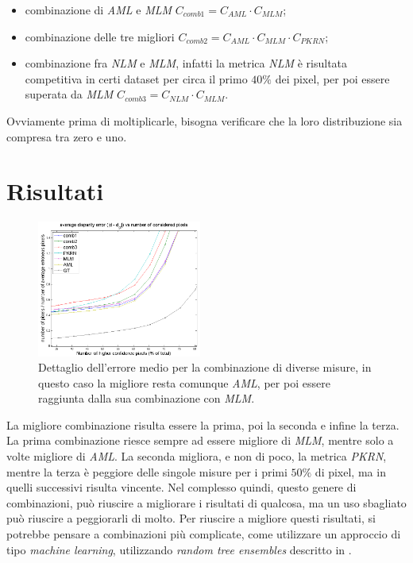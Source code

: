 \documentclass[12pt]{report}
\begin{document}
		\begin{itemize}
			\item combinazione di \textit{AML} e \textit{MLM} $C_{comb1}=C_{AML}\cdot C_{MLM}$;
			
			\item combinazione delle tre migliori $C_{comb2}=C_{AML}\cdot C_{MLM}\cdot C_{PKRN}$;
			
			\item combinazione fra \textit{NLM} e \textit{MLM}, infatti la metrica \textit{NLM} è risultata competitiva in certi dataset per circa il primo $40\%$ dei pixel, per poi essere superata da \textit{MLM} $C_{comb3}=C_{NLM}\cdot C_{MLM}$. 
			\label{item:combinazioni}		
		\end{itemize}
		
		\noindent Ovviamente prima di moltiplicarle, bisogna verificare che la loro distribuzione sia compresa tra zero e uno.
		
		
		\section{Risultati}
		\label{sec:risultatiCombinazioni}

			\begin{figure}
				\centering
				\includegraphics[width=0.48\textwidth]{./figures/result6.png}
				\caption{Dettaglio dell'errore medio per la combinazione di diverse misure, in questo caso la migliore resta comunque \textit{AML}, per poi essere raggiunta dalla sua combinazione con \textit{MLM}.}
				\label{fig:combinazioni}
			\end{figure} 

		
			La migliore combinazione risulta essere la prima, poi la seconda e infine la terza. La prima combinazione riesce sempre ad essere migliore di \textit{MLM}, mentre solo a volte migliore di \textit{AML}. La seconda migliora, e non di poco, la metrica \textit{PKRN}, mentre la terza è peggiore delle singole misure per i primi $50 \%$ di pixel, ma in quelli successivi risulta vincente. Nel complesso quindi, questo genere di combinazioni, può riuscire a migliorare i risultati di qualcosa, ma un uso sbagliato può riuscire a peggiorarli di molto. \newline
			Per riuscire a migliore questi risultati, si potrebbe pensare a combinazioni più complicate, come utilizzare un approccio di tipo \textit{machine learning}, utilizzando \textit{random tree ensembles} descritto in \cite{combinazioni_complicate}.
	
\end{document}
